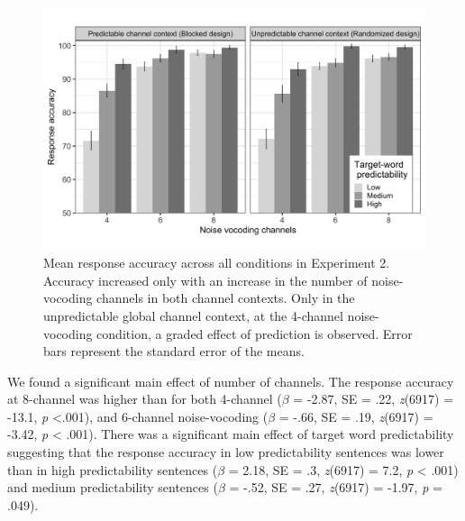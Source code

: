 \documentclass[a4paper, nobind]{templates/ociamthesis}
\begin{document}
\begin{figure}

{\centering \includegraphics[width=0.95\linewidth]{figures/results-fig/expt-2} 

}

\caption{Mean response accuracy across all conditions in Experiment 2. Accuracy increased only with an increase in the number of noise-vocoding channels in both channel contexts. Only in the unpredictable global channel context, at the 4-channel noise-vocoding condition, a graded effect of prediction is observed. Error bars represent the standard error of the means.}\label{fig:figure2}
\end{figure}

We found a significant main effect of number of channels.
The response accuracy at 8-channel was higher than for both 4-channel
(\(\beta\) = -2.87, SE = .22, \emph{z}(6917) = -13.1, \emph{p} \textless.001),
and 6-channel noise-vocoding (\(\beta\) = -.66, SE = .19, \emph{z}(6917) = -3.42, \emph{p} \textless{} .001).
There was a significant main effect of target word predictability suggesting that
the response accuracy in low predictability sentences was lower than in high predictability sentences
(\(\beta\) = 2.18, SE = .3, \emph{z}(6917) = 7.2, \emph{p} \textless{} .001) and medium predictability sentences
(\(\beta\) = -.52, SE = .27, \emph{z}(6917) = -1.97, \emph{p} = .049).
\end{document}

